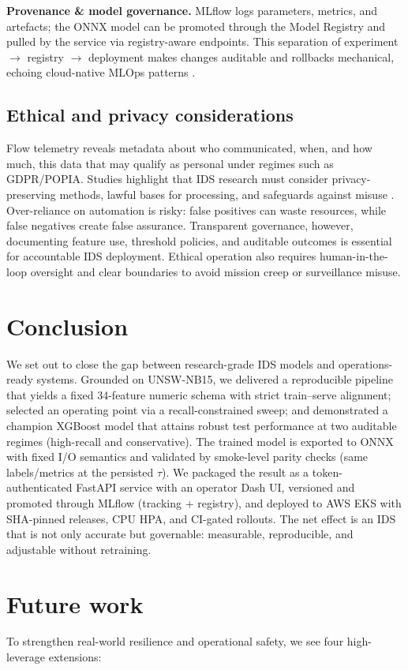\documentclass{article}
\begin{document}
\textbf{Provenance \& model governance.} MLflow logs parameters, metrics, and artefacts; the ONNX model can be promoted through the Model Registry and pulled by the service via registry-aware endpoints. This separation of experiment $\to$ registry $\to$ deployment makes changes auditable and rollbacks mechanical, echoing cloud-native MLOps patterns \cite{naayini2025}.

\subsection{Ethical and privacy considerations}
Flow telemetry reveals metadata about who communicated, when, and how much, this data that may qualify as personal under regimes such as GDPR/POPIA. Studies highlight that IDS research must consider privacy-preserving methods, lawful bases for processing, and safeguards against misuse \cite{rahman2024_synth}. Over-reliance on automation is risky: false positives can waste resources, while false negatives create false assurance. Transparent governance, however, documenting feature use, threshold policies, and auditable outcomes is essential for accountable IDS deployment. Ethical operation also requires human-in-the-loop oversight and clear boundaries to avoid mission creep or surveillance misuse.

\section{Conclusion}
We set out to close the gap between research-grade IDS models and operations-ready systems. Grounded on UNSW-NB15, we delivered a reproducible pipeline that yields a fixed 34-feature numeric schema with strict train–serve alignment; selected an operating point via a recall-constrained sweep; and demonstrated a champion XGBoost model that attains robust test performance at two auditable regimes (high-recall and conservative). The trained model is exported to ONNX with fixed I/O semantics and validated by smoke-level parity checks (same labels/metrics at the persisted $\tau$). We packaged the result as a token-authenticated FastAPI service with an operator Dash UI, versioned and promoted through MLflow (tracking + registry), and deployed to AWS EKS with SHA-pinned releases, CPU HPA, and CI-gated rollouts. The net effect is an IDS that is not only accurate but governable: measurable, reproducible, and adjustable without retraining.

\section{Future work}
To strengthen real-world resilience and operational safety, we see four high-leverage extensions:
\end{document}
